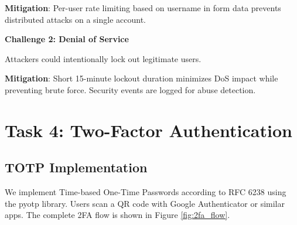 \documentclass[12pt,a4paper]{article}
\begin{document}
\textbf{Mitigation}: Per-user rate limiting based on username in form data prevents distributed attacks on a single account.

\textbf{Challenge 2: Denial of Service}

Attackers could intentionally lock out legitimate users.

\textbf{Mitigation}: Short 15-minute lockout duration minimizes DoS impact while preventing brute force. Security events are logged for abuse detection.

\section{Task 4: Two-Factor Authentication}

\subsection{TOTP Implementation}

We implement Time-based One-Time Passwords according to RFC 6238 \cite{mraihi2011} using the pyotp library. Users scan a QR code with Google Authenticator or similar apps. The complete 2FA flow is shown in Figure \ref{fig:2fa_flow}.
\end{document}
